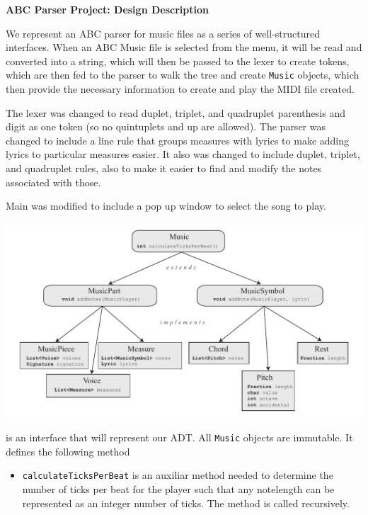 \documentclass[12pt]{book}
\begin{document}
\phantom{xxx}
\bigskip
\centerline{{\large \bf ABC Parser Project: Design Description }}
\bigskip\bigskip


We represent an ABC parser for music files as a series of well-structured interfaces. When an ABC Music file is selected from the menu, it will be read and converted into a string, which will then be passed to the lexer to create tokens, which are then fed to the parser to walk the tree and create {\tt Music} objects, which then provide the necessary information to create and play the MIDI file created.


The lexer was changed to read duplet, triplet, and quadruplet parenthesis and digit as one token (so no quintuplets and up are allowed). The parser was changed to include a line rule that groups measures with lyrics to make adding lyrics to particular measures easier. It also was changed to include duplet, triplet, and quadruplet rules, also to make it easier to find and modify the notes associated with those.

Main was modified to include a pop up window to select the song to play.

\centerline{ \includegraphics{Music.pdf}}

 is an interface that will represent our ADT. All {\tt Music} objects are immutable. It defines the following method

\begin{itemize} 

\item { \tt calculateTicksPerBeat} is an auxiliar method needed to determine the number of ticks per beat for the player such that any notelength can be represented as an integer number of ticks. The method is called recursively.
\end{itemize}
\end{document}
